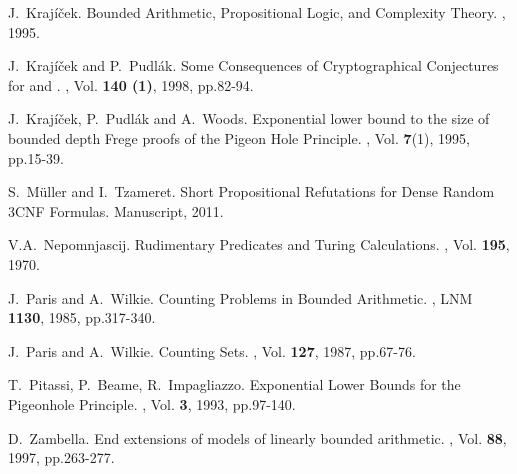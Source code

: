 \documentclass{LMCS}
\begin{document}
\begin{thebibliography}{10}
J.~Kraj\' i\v cek.
\newblock Bounded Arithmetic, Propositional Logic, and Complexity Theory.
, 1995.

J.~Kraj\' i\v cek and P.~Pudl\' ak.
\newblock Some Consequences of Cryptographical Conjectures for  and .
, Vol. {\bf 140 (1)}, 1998, pp.82-94.

J.~Kraj\' i\v cek, P.~Pudl\' ak and A.~Woods.
\newblock Exponential lower bound to the size of bounded depth Frege proofs
of the Pigeon Hole Principle.
, Vol. {\bf 7}(1), 1995, pp.15-39.

S.~M\" uller and I.~Tzameret.
\newblock Short Propositional Refutations for Dense Random 3CNF Formulas.
\newblock Manuscript, 2011.

V.A.~Nepomnjascij.
\newblock Rudimentary Predicates and Turing Calculations.
, Vol. {\bf 195}, 1970.

J.~Paris and A.~Wilkie.
\newblock Counting Problems in Bounded Arithmetic.
, LNM {\bf 1130}, 1985, pp.317-340.

J.~Paris and A.~Wilkie.
\newblock Counting  Sets.
, Vol. {\bf 127}, 1987, pp.67-76.

T.~Pitassi, P.~Beame, R.~Impagliazzo.
\newblock Exponential Lower Bounds for the Pigeonhole Principle.
, Vol. {\bf 3}, 1993, pp.97-140.

D.~Zambella.
\newblock End extensions of models of linearly bounded arithmetic.
, Vol. {\bf 88}, 1997, pp.263-277.

\end{thebibliography}
\end{document}
